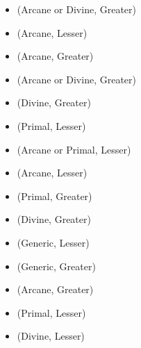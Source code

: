 \begin{itemize}
	\item {} (Arcane or Divine, Greater)
	\item {} (Arcane, Lesser)
	\item {} (Arcane, Greater)
	\item {} (Arcane or Divine, Greater)
	\item {} (Divine, Greater)
	\item {} (Primal, Lesser)
	\item {} (Arcane or Primal, Lesser)
	\item {} (Arcane, Lesser)
	\item {} (Primal, Greater)
	\item {} (Divine, Greater)
	\item {} (Generic, Lesser)
	\item {} (Generic, Greater)
	\item {} (Arcane, Greater)
	\item {} (Primal, Lesser)
	\item {} (Divine, Lesser)
\end{itemize}




